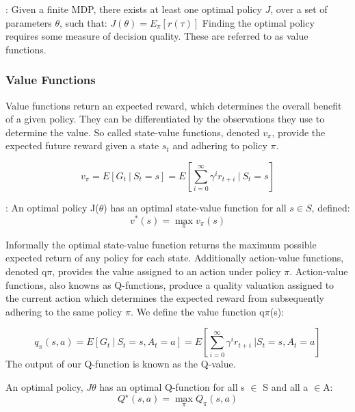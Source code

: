 \documentclass[runningheads]{llncs}
\begin{document}
\begin{theorem}	: Given a finite MDP, there exists at least one optimal policy $J$, over a set of parameters $\theta$, such that:
	$J(\theta) = E_\pi[r(\tau)]$
	Finding the optimal policy requires some measure of decision quality. These are referred to as value functions.
\end{theorem}

\subsubsection{Value Functions}
Value functions return an expected reward, which determines the overall benefit of a given policy. They can be differentiated by the observations they use to determine the value. So called state-value functions, denoted $v_\pi$, provide the expected future reward given a state $s_t$ and adhering to policy  $\pi$. 

\begin{equation}
	v_\pi = E[G_t \ | \ S_t = s]  
	= E \left[\sum_{i=0}^{\infty}\gamma^{i}r_{t+i} \ | \ S_t = s\right]
\end{equation}

\begin{theorem}	: An optimal policy J($\theta$) has an optimal state-value function for all $s \in S$, defined:
	\begin{equation}
		v^{*}(s) = \max_\pi v_\pi(s)
	\end{equation}
\end{theorem}

Informally the optimal state-value function returns the maximum possible expected return of any policy for each state. Additionally action-value functions, denoted q$\pi$, provides the value assigned to an action under policy $\pi$. Action-value functions, also knowns as Q-functions, produce a quality valuation assigned to the current action which determines the expected reward from subsequently adhering to the same policy $\pi$. We define the value function q$\pi$(s):

\begin{equation}
	q_\pi(s,a) = E [G_t \ | \ S_t = s, A_t = a]
	= E \left[\sum_{i=0}^{\infty} \gamma^{i}r_{t+i} \ | S_t = s, A_t = a \right]
\end{equation}
The output of our Q-function is known as the Q-value.


\begin{theorem}
	An optimal policy, $J\theta$ has an optimal Q-function for
	all s $\in$ S and all a $\in$A:
	\begin{equation}
		Q^\star(s,a) = \max_\pi Q_\pi(s,a)
	\end{equation} 
\end{theorem}
\end{document}
